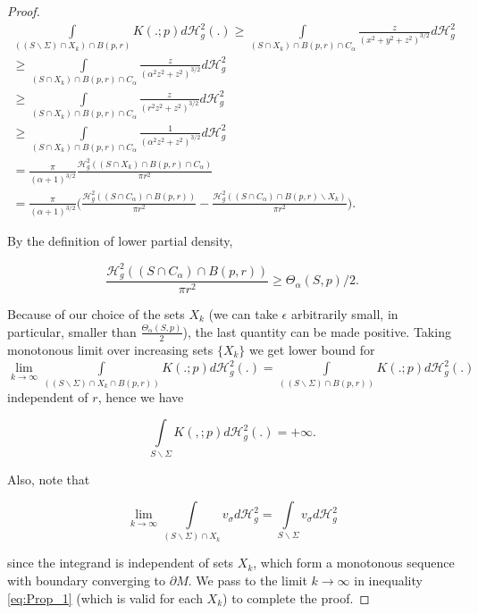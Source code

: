 \documentclass{amsart}
\newcommand{\hm}{\mathscr{H}}
\newcommand{\s}{\Sigma}
\theoremstyle{named}
\begin{document}
\begin{proof}
    \begin{align*}
        \int\limits_{((S \backslash \Sigma) \cap X_k) \cap B(p,r)} K (.;p)d\hm^2_g (.) \geq \int\limits_{(S \cap X_k) \cap B(p,r) \cap C_{\alpha}} \frac{z}{(x^2 + y^2 + z^2)^{3/2}} d\hm^2_g \\
        \geq \int\limits_{(S \cap X_k) \cap B(p,r) \cap C_{\alpha}} \frac{z}{(\alpha^2 z^2 + z^2)^{3/2}} d\hm^2_g \\
        \geq \int\limits_{(S \cap X_k) \cap B(p,r) \cap C_{\alpha}} \frac{z}{(r^2 z^2 + z^2)^{3/2}} d\hm^2_g \\
        \geq \int\limits_{(S \cap X_k) \cap B(p,r) \cap C_{\alpha}} \frac{1}{(\alpha^2 z^2 + z^2)^{3/2}} d\hm^2_g \\
        = \frac{\pi}{(\alpha +1)^{3/2}} \frac{\hm^2_g((S \cap X_k) \cap B(p,r) \cap C_{\alpha})}{\pi r^2} \\
        = \frac{\pi}{(\alpha +1)^{3/2}} \bigg( \frac{\hm^2_g((S \cap C_{\alpha}) \cap B(p,r))}{\pi r^2} - \frac{\hm^2_g((S \cap C_{\alpha}) \cap B(p,r) \backslash X_k)}{\pi r^2} \bigg).
    \end{align*}

    By the definition of lower partial density,

    \begin{equation*}
        \frac{\hm^2_g((S \cap C_{\alpha}) \cap B(p,r))}{\pi r^2} \geq \Theta_{\alpha}(S, p) / 2.
    \end{equation*}

    Because of our choice of the sets $X_k$ (we can take $\epsilon$ arbitrarily small, in particular, smaller than $\frac{\Theta_{\alpha}(S,p)}{2}$), the last quantity can be made positive. Taking monotonous limit over increasing sets $\{X_k\}$ we get lower bound for $\lim\limits_{k \rightarrow \infty} \int\limits_{((S \backslash \Sigma) \cap X_k \cap B(p,r))} K (.;p)d\hm^2_g (.) = \int\limits_{((S \backslash \Sigma) \cap B(p,r))} K (.;p)d\hm^2_g (.)$ independent of $r$, hence we have 

    \begin{equation}
        \int\limits_{S \backslash \Sigma} K (,;p)d\hm^2_g(.) = + \infty.
    \end{equation}

    Also, note that 

    \begin{equation*}
        \lim\limits_{k \rightarrow \infty} \int \limits_{(S \backslash \s) \cap X_k} v_{\sigma} d\hm^2_g = \int\limits_{S \backslash \s} v_{\sigma} d\hm^2_g
    \end{equation*}

    since the integrand is independent of sets $X_k$, which form a monotonous sequence with boundary converging to $\partial M$. We pass to the limit $k \rightarrow \infty$ in inequality \eqref{eq:Prop_1} (which is valid for each $X_k$) to complete the proof.
    
\end{proof}
\end{document}
